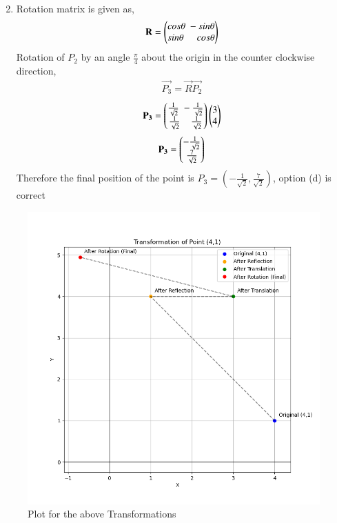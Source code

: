 \documentclass[journal]{IEEEtran}
\begin{document}
\begin{enumerate}[label=(\alph*)]
\begin{align}
             \end{align}
             \item Rotation matrix is given as,
             \begin{align}
                 \mathbf{R}=\begin{pmatrix}cos\theta\;-sin\theta\\sin\theta\;\;\;\;\;cos\theta\end{pmatrix}
             \end{align}
             Rotation of $P_2$ by an angle $\frac{\pi}{4}$ about the origin in the counter clockwise direction,
             \begin{align}
                 \vec{P_3}=\vec{R}\vec{P_2}
             \end{align}
             \begin{align}
                 \mathbf{P_3}=\begin{pmatrix}\frac{1}{\sqrt{2}}\;-\frac{1}{\sqrt{2}}\\\frac{1}{\sqrt{2}}\;\;\;\;\frac{1}{\sqrt{2}}\end{pmatrix}\begin{pmatrix}3\\4\end{pmatrix}
             \end{align}
             \begin{align}
                 \mathbf{P_3}=\begin{pmatrix}-\frac{1}{\sqrt{2}}\\\frac{7}{\sqrt{2}}\end{pmatrix}
             \end{align}
             Therefore the final position of the point is $P_3=(-\frac{1}{\sqrt{2}},\frac{7}{\sqrt{2}})$, option (d) is correct
             \end{enumerate}
             \begin{figure}[h]
                 \centering
                 \includegraphics[width=0.9\columnwidth]{figs/fig1.png}
                 \caption{Plot for the above Transformations}
                 \label{fig1}
             \end{figure}
         
\end{document}
